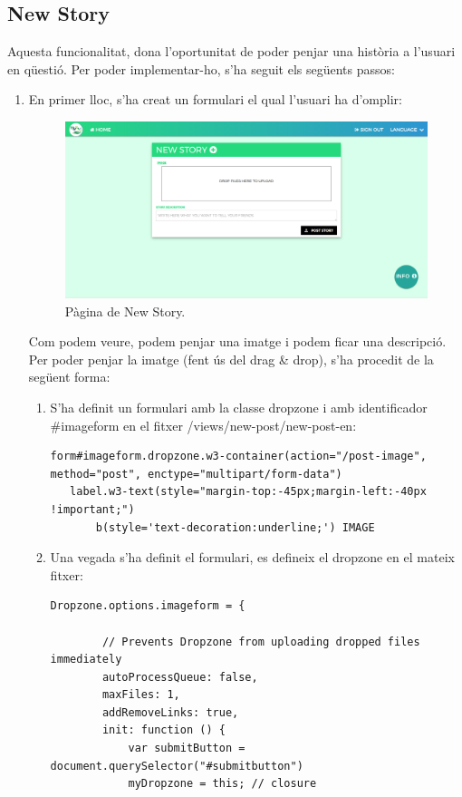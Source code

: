 \documentclass[11pt,catalan,listoffigures,listoftables]{tfgetsinf}
\begin{document}
\subsection{New Story}
Aquesta funcionalitat, dona l'oportunitat de poder penjar una història a l'usuari en qüestió. Per poder implementar-ho, s'ha seguit els següents passos:
\newpage
\begin{enumerate}
\item En primer lloc, s'ha creat un formulari el qual l'usuari ha d'omplir:
\begin{figure}[h]
\includegraphics[width=15cm]{images/image14}
\centering
\caption[Figura 3.1]{Pàgina de New Story.}
\centering
\end{figure}
Com podem veure, podem penjar una imatge i podem ficar una descripció. Per poder penjar la imatge (fent ús del drag \& drop), s'ha procedit de la següent forma:
\begin{enumerate}
\item S'ha definit un formulari amb la classe dropzone i amb identificador \#imageform en el fitxer /views/new-post/new-post-en:
\begin{lstlisting}
form#imageform.dropzone.w3-container(action="/post-image", method="post", enctype="multipart/form-data")
   label.w3-text(style="margin-top:-45px;margin-left:-40px !important;")
       b(style='text-decoration:underline;') IMAGE
\end{lstlisting}
\item Una vegada s'ha definit el formulari, es defineix el dropzone en el mateix fitxer:
\begin{lstlisting}
Dropzone.options.imageform = {

        // Prevents Dropzone from uploading dropped files immediately
        autoProcessQueue: false,
        maxFiles: 1,
        addRemoveLinks: true,
        init: function () {
            var submitButton = document.querySelector("#submitbutton")
            myDropzone = this; // closure


\end{lstlisting}
\end{enumerate}
\end{enumerate}
\end{document}
